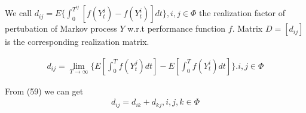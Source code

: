 \documentclass[runningheads]{llncs}
\begin{document}
    \begin{definition}
        We call $d_{ij} = E \{ \int_0^{T^{ij}} [ f(Y_t^j) - f(Y_t^i) ] dt \}, i, j \in \Phi$
        the realization factor of pertubation of Markov process $Y$ w.r.t performance function $f$.
        Matrix $D = [d_{ij}]$ is the corresponding realization matrix.
    \end{definition}

    \begin{lemma}
        \begin{align}
            d_{ij} = \mathop{\lim}_{T \rightarrow \infty} \{ E [ \int_0^T f(Y_t^j)dt ] -  E [ \int_0^T f(Y_t^i)dt ] \}. i, j \in \Phi
        \end{align}
    \end{lemma}
    \par
    From (59) we can get
    \begin{align}
        d_{ij} = d_{ik} + d_{kj}, i, j, k \in \Phi
    \end{align}
    

    
\end{document}
